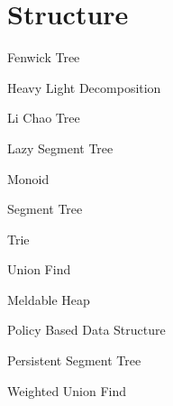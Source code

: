 \section{Structure}

Fenwick Tree


Heavy Light Decomposition


Li Chao Tree


Lazy Segment Tree





Monoid


Segment Tree


Trie


Union Find


Meldable Heap


Policy Based Data Structure


Persistent Segment Tree



Weighted Union Find

